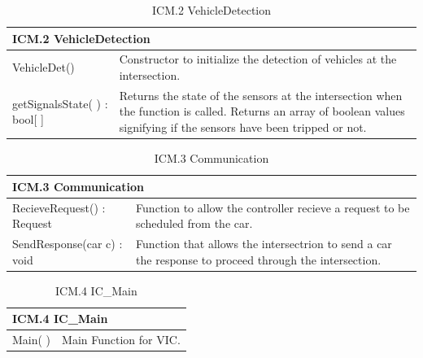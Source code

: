 \documentclass [10pt]{article}
\begin{document}
\begin{longtable}{| p{ } | p{ } | }\caption{ICM.2 VehicleDetection} \\\hline  
 \multicolumn{2}{|l|}{\textbf {ICM.2 VehicleDetection}}\\ \hline
 
\cellcolor{tableCell}VehicleDet()& \cellcolor{tableCell}Constructor to initialize the detection of vehicles at the intersection. \\ \hline 

getSignalsState( ) : bool[ ] & Returns the state of the sensors at the intersection when the function is called. Returns an array of boolean values signifying if the sensors have been tripped or not. \\ \hline 



\end{longtable}

\begin{longtable}{| p{ } | p{ } | }\caption{ICM.3 Communication} \\\hline  
 \multicolumn{2}{|l|}{\textbf {ICM.3 Communication}}\\ \hline
 
\cellcolor{tableCell}RecieveRequest() : Request& \cellcolor{tableCell}Function to allow the controller recieve a request to be scheduled from the car.\\ \hline 


SendResponse(car c) : void & Function that allows the intersectrion to send a car the response to proceed through the intersection. \\ \hline




\end{longtable}

\begin{longtable}{| p{ } | p{ } | }\caption{ICM.4 IC\_Main} \\\hline  
 \multicolumn{2}{|l|}{\textbf {ICM.4 IC\_Main}}\\ \hline
 
\cellcolor{tableCell}Main( ) & \cellcolor{tableCell}Main Function for VIC. \\ \hline 




\end{longtable}
\end{document}
